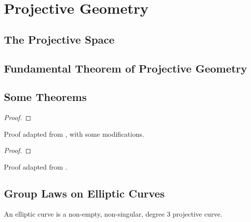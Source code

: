 \chapter{Projective Geometry}

\section{The Projective Space}

\section{Fundamental Theorem of Projective Geometry}

\section{Some Theorems}

\begin{theorem}
\end{theorem}

\begin{proof}
\end{proof}

\begin{remark}
  Proof adapted from \cite{brannan}, with some modifications.
\end{remark}

\begin{theorem}
\end{theorem}

\begin{proof}
\end{proof}

\begin{remark}
  Proof adapted from \cite{yzeren}.
\end{remark}

\section{Group Laws on Elliptic Curves}

\begin{definition}
  An elliptic curve is a non-empty, non-singular, degree 3 projective curve. \cite{spallone}
\end{definition}
